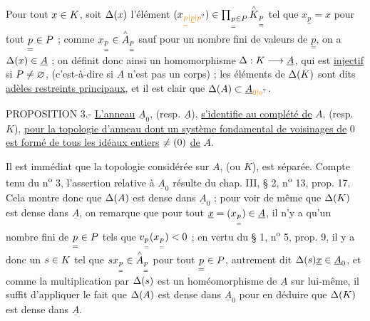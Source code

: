 Pour tout $x\in K$, soit $\Delta(x)$ l'élément $(x_{\unsure{\underset{=}{p}|\underline{p}|p}})\handwritten{\in\prod}_{\underset{=}{p}\handwritten{\in}P}\overset{\handwritten{\scriptscriptstyle\wedge}}{K}_{\underset{=}{p}}$ tel que $x_{\underset{=}{p}}=x$ pour tout $\underset{=}{p}\in P$ ; comme $x_{\underset{=}{p}}\in\overset{\scriptscriptstyle\wedge}{A}_{\underset{=}{p}}$ sauf pour un nombre fini de valeurs de $\underset{=}{p}$, on a $\Delta(x)\in\underline{A}$ ; on définit donc ainsi un homomorphisme $\Delta:K\longrightarrow \underline{A}$, qui est \uline{injectif} si $P\ne\varnothing$, (c'est-à-dire si $A$ n'est pas un corps) ; les éléments de $\Delta(K)$ sont dits \uline{adèles restreints principaux}, et il est clair que $\handwritten{\Delta}(A)\handwritten{\subset}\underline{A}_{\unsure{0|o}}$.

PROPOSITION 3.- \uline{L'anneau} $\underline{A}_0$, (resp. $\underline{A}$), \uline{s'identifie au complété de} $A$, (resp. $K$), \uline{pour la topologie d'anneau dont un système fondamental de voisinages de} $0$ \uline{est formé de tous les idéaux entiers} $\ne(0)$ \uline{de} $A$.

Il est immédiat que la topologie considérée sur $A$, (ou $K$), est séparée. Compte tenu du n\textsuperscript{o} 3, l'assertion relative à $\underline{A}_0$ résulte du chap. III, § 2, n\textsuperscript{o} 13, prop. 17. Cela montre donc que $\Delta(A)$ est dense dans $\underline{A}_0$ ; pour voir de même que $\Delta(K)$ est dense dans $\underline{A}$, on remarque que pour tout $\underline{x}=(x_{\underset{=}{p}})\in\underline{A}$, il n'y a qu'un nombre fini de $\underset{=}{p}\in P$ tels que $v_{\underset{=}{p}}(x_{\underset{=}{p}})<0$ ; en vertu du § 1, n\textsuperscript{o} 5, prop. 9, il y a donc un $s\in K$ tel que $sx_{\underset{=}{p}}\in\overset{\scriptscriptstyle\wedge}{A}_{\underset{=}{p}}$ pour tout $\underset{=}{p}\in P$, autrement dit $\Delta(s)\underline{x}\in\underline{A}_0$, et comme la multiplication par $\Delta(s)$ est un homéomorphisme de $\underline{A}$ sur lui-même, il suffit d'appliquer le fait que $\Delta(A)$ est dense dans $\underline{A}_0$ pour en déduire que $\Delta(K)$ est dense dans $\underline{A}$.

